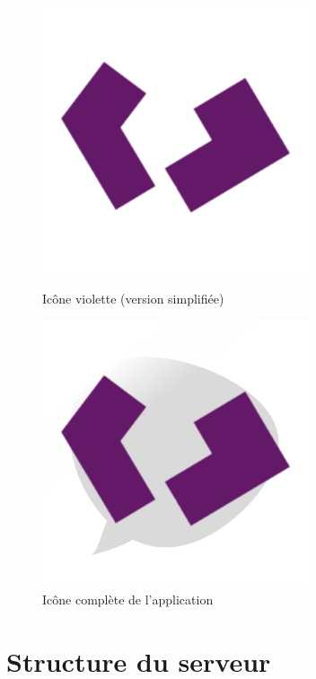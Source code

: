 \documentclass[12pt]{report}
\begin{document}
\begin{figure}[H]
	\centering
	\begin{minipage}[t]{0.45\textwidth}
		\centering
		\includegraphics[width=0.7\textwidth]{img/logo_purple.png}
		\caption{Icône violette (version simplifiée)}
	\end{minipage}
	\hfill
	\begin{minipage}[t]{0.45\textwidth}
		\centering
		\includegraphics[width=0.7\textwidth]{img/logo_full.png}
		\caption{Icône complète de l’application}
	\end{minipage}
\end{figure}

\chapter{Structure du serveur}
\end{document}
